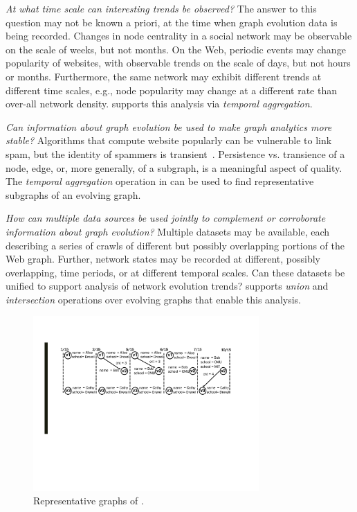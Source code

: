 {\em At what time scale can interesting trends be observed?} The
answer to this question may not be known a priori, at the time when
graph evolution data is being recorded.  Changes in node centrality in
a social network may be observable on the scale of weeks, but not
months.  On the Web, periodic events may change popularity
of websites, with observable trends on the scale of days, but not
hours or months.  Furthermore, the same network may
exhibit different trends at different time scales, e.g., node
popularity may change at a different rate than over-all network
density.  \ql supports this analysis via {\em temporal aggregation}.

{\em Can information about graph evolution be used to make graph
  analytics more stable?}  Algorithms that compute
website popularly can be vulnerable to link spam, but the identity 
of spammers is transient~\cite{DBLP:conf/cikm/YangQZGL07}.  Persistence 
vs. transience of a node, edge, or, more 
generally, of a subgraph, is a meaningful aspect of quality.  
  The {\em temporal aggregation} operation in \ql
{}can be used to find
representative subgraphs of an evolving graph.

{\em How can multiple data sources be used jointly to complement or
  corroborate information about graph evolution?}  Multiple datasets may be available, each describing a
series of crawls of different but possibly overlapping portions of
the Web graph.  Further, network states may be recorded at different,
possibly overlapping, time periods, or at different temporal scales.
Can these datasets be unified to support
analysis of network evolution trends?  \ql
supports {\em union} and {\em intersection} operations over evolving
graphs that enable this analysis.

\begin{figure}[t!]
\includegraphics[width=3.4in]{figs/T1_graphs.pdf}
\vspace{-0.5cm}
\caption{Representative graphs of \tg {}.}
\vspace{-0.4cm}
\label{fig:tg_rg}
\end{figure}

